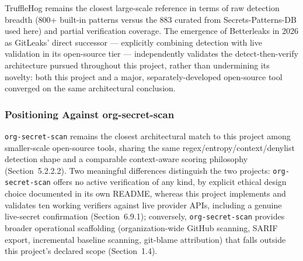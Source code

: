 \documentclass[12pt]{article}
\begin{document}
TruffleHog remains the closest large-scale reference in terms of raw detection breadth (800+ built-in patterns versus the 883 curated from Secrets-Patterns-DB used here) and partial verification coverage. The emergence of Betterleaks in 2026 as GitLeaks' direct successor --- explicitly combining detection with live validation in its open-source tier --- independently validates the detect-then-verify architecture pursued throughout this project, rather than undermining its novelty: both this project and a major, separately-developed open-source tool converged on the same architectural conclusion.

\subsubsection{Positioning Against org-secret-scan}

\texttt{org-secret-scan} remains the closest architectural match to this project among smaller-scale open-source tools, sharing the same regex/entropy/context/denylist detection shape and a comparable context-aware scoring philosophy (Section~5.2.2.2). Two meaningful differences distinguish the two projects: \texttt{org-secret-scan} offers no active verification of any kind, by explicit ethical design choice documented in its own README, whereas this project implements and validates ten working verifiers against live provider APIs, including a genuine live-secret confirmation (Section~6.9.1); conversely, \texttt{org-secret-scan} provides broader operational scaffolding (organization-wide GitHub scanning, SARIF export, incremental baseline scanning, git-blame attribution) that falls outside this project's declared scope (Section~1.4).
\end{document}
